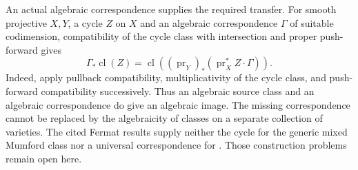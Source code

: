 An actual algebraic correspondence supplies the required transfer.
For smooth projective $X,Y$, a cycle $Z$ on $X$ and an algebraic
correspondence $\Gamma$ of suitable codimension, compatibility of the
cycle class with intersection and proper push-forward gives
\[
 \Gamma_*\operatorname{cl}(Z)=
 \operatorname{cl}\!\left((\operatorname{pr}_Y)_*
       (\operatorname{pr}_X^*Z\cdot\Gamma)\right).
\]
Indeed, apply pullback compatibility, multiplicativity of the cycle
class, and push-forward compatibility successively. Thus an algebraic
source class and an algebraic correspondence do give an algebraic
image. The missing correspondence cannot be replaced by the
algebraicity of classes on a separate collection of varieties.
The cited Fermat results supply neither the cycle for the generic
mixed Mumford class nor a universal correspondence for \Fiii{}.
Those construction problems remain open here.
